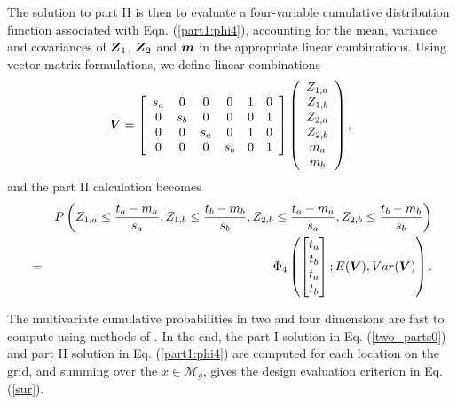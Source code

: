 \documentclass[aoas]{imsart}
\begin{document}
The solution to part II is then to evaluate a four-variable cumulative distribution function associated with Eqn. (\ref{part1:phi4}), accounting for the mean, variance and covariances of ${\boldsymbol Z}_1$, ${\boldsymbol Z}_2$ and ${\boldsymbol m}$ in the appropriate linear combinations. Using vector-matrix formulations, we define linear combinations
\begin{equation}\label{Vcomb}
    \bV=\left[
    \begin{array}{cccccc}
        s_a & 0 & 0 & 0 & 1 & 0 \\
         0 & s_b & 0 & 0 & 0 & 1 \\
         0 & 0 & s_a & 0 & 1 & 0\\
         0 & 0 & 0 & s_b & 0 & 1\\
    \end{array}
    \right] 
    \left(
    \begin{array}{cccccc}
         Z_{1,a} \\
         Z_{1,b} \\
         Z_{2,a} \\
         Z_{2,b} \\
         m_{a} \\
         m_{b}
    \end{array}
    \right),
\end{equation}
and the part II calculation becomes
\begin{eqnarray}\label{part1:phi4}
&& P \left( Z_{1,a} \leq \frac{t_a-m_{a}}{s_{a}}, 
Z_{1,b} \leq \frac{t_b-m_{b}}{s_{b}},Z_{2,b} \leq \frac{t_a-m_{a}}{s_{a}}, 
Z_{2,b} \leq \frac{t_b-m_{b}}{s_{b}} \right)  \\
&=&  \Phi_4 
\begin{pmatrix} 
\begin{bmatrix} t_a\\
t_b \\
t_a \\
t_b
\end{bmatrix};
E( \bV),Var(\bV)
\end{pmatrix} \nonumber.
\end{eqnarray}

The multivariate cumulative probabilities in two and four dimensions are fast to compute using methods of \cite{genz2009computation}.
In the end, the part I solution in Eq. (\ref{two_parts0}) and part II solution in Eq. (\ref{part1:phi4}) are computed for each location on the grid, and summing over the $x \in \mathcal{M}_g$, gives the design evaluation criterion in Eq. (\ref{sur}).
\end{document}

